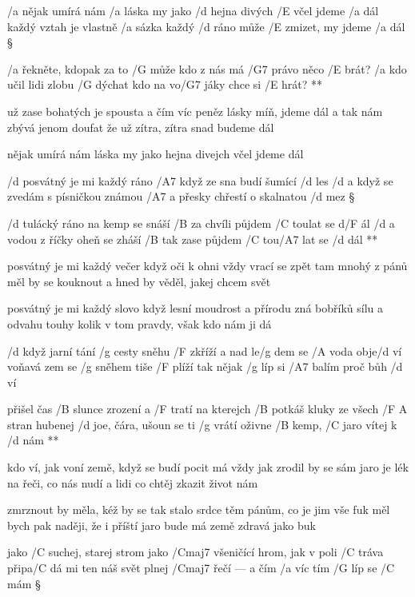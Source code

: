 
/a nějak umírá nám /{a\heart} láska
my jako /d hejna divých /E včel jdeme /a dál
každý vztah je vlastně /{a\heart} sázka
každý /d ráno může /E zmizet, my jdeme /a dál \S

\R /a řekněte, kdopak za to /G může
   kdo z nás má /G7 právo něco /E brát?
   /a kdo učil lidi zlobu /G dýchat
   kdo na vo/G7 jáky chce si /E hrát? **

už zase bohatých je spousta
a čím víc peněz lásky míň, jdeme dál
a tak nám zbývá jenom doufat
že už zítra, zítra snad budeme dál \s

nějak umírá nám láska
my jako hejna divejch včel jdeme dál




/d posvátný je mi každý ráno
/A7 když ze sna budí šumící /d les
/d a když se zvedám s písničkou známou
/A7 a přesky chřestí o skalnatou /d mez \S

\R /d tulácký ráno na kemp se snáší
   /B za chvíli půjdem /C toulat se d/F ál
   /d a vodou z říčky oheň se zháší
   /B tak zase půjdem /C tou/A7 lat se /d dál **

posvátný je mi každý večer
když oči k ohni vždy vrací se zpět
tam mnohý z pánů měl by se kouknout
a hned by věděl, jakej chcem svět \s

posvátný je mi každý slovo
když lesní moudrost a přírodu zná
bobříků sílu a odvahu touhy
kolik v tom pravdy, však kdo nám ji dá




/d když jarní tání /g cesty sněhu /F zkříží
a nad le/g dem se /A voda obje/d ví
voňavá zem se /g sněhem tiše /F plíží
tak nějak /g líp si /A7 balím proč bůh /d ví \songgg

\R přišel čas /B slunce zrození a /F tratí
   na kterejch /B potkáš kluky ze všech /{F A} stran
   hubenej /d joe, čára, ušoun se ti /g vrátí
   oživne /B kemp, /C jaro vítej k /d nám **

kdo ví, jak voní země, když se budí
pocit má vždy jak zrodil by se sám
jaro je lék na řeči, co nás nudí
a lidi co chtěj zkazit život nám \s

zmrznout by měla, kéž by se tak stalo
srdce těm pánům, co je jim vše fuk
měl bych pak naději, že i příští jaro
bude má země zdravá jako buk




jako /C suchej, starej strom
jako /Cmaj7 všeničící hrom, jak v poli /C tráva
připa/C dá mi ten náš svět
plnej /Cmaj7 řečí --- a čím /a víc tím /G líp se /C mám \S

